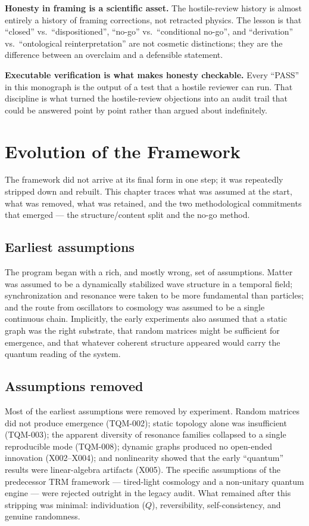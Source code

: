 \documentclass[10pt,twoside,openany]{book}
\begin{document}
\textbf{Honesty in framing is a scientific asset.} The hostile-review history is almost
entirely a history of framing corrections, not retracted physics. The lesson is that
``closed'' vs.\ ``dispositioned'', ``no-go'' vs.\ ``conditional no-go'', and ``derivation''
vs.\ ``ontological reinterpretation'' are not cosmetic distinctions; they are the
difference between an overclaim and a defensible statement.

\textbf{Executable verification is what makes honesty checkable.} Every ``PASS'' in this
monograph is the output of a test that a hostile reviewer can run. That discipline is what
turned the hostile-review objections into an audit trail that could be answered point by
point rather than argued about indefinitely.

\chapter{Evolution of the Framework}
\label{ch:evolution}

The framework did not arrive at its final form in one step; it was repeatedly stripped
down and rebuilt. This chapter traces what was assumed at the start, what was removed,
what was retained, and the two methodological commitments that emerged --- the
structure/content split and the no-go method.

\section{Earliest assumptions}

The program began with a rich, and mostly wrong, set of assumptions. Matter was assumed to
be a dynamically stabilized wave structure in a temporal field; synchronization and
resonance were taken to be more fundamental than particles; and the route from oscillators
to cosmology was assumed to be a single continuous chain. Implicitly, the early experiments
also assumed that a static graph was the right substrate, that random matrices might be
sufficient for emergence, and that whatever coherent structure appeared would carry the
quantum reading of the system.

\section{Assumptions removed}

Most of the earliest assumptions were removed by experiment. Random matrices did not
produce emergence (TQM-002); static topology alone was insufficient (TQM-003); the
apparent diversity of resonance families collapsed to a single reproducible mode (TQM-008);
dynamic graphs produced no open-ended innovation (X002--X004); and nonlinearity showed that
the early ``quantum'' results were linear-algebra artifacts (X005). The specific assumptions
of the predecessor TRM framework --- tired-light cosmology and a non-unitary quantum engine
--- were rejected outright in the legacy audit. What remained after this stripping was
minimal: individuation ($Q$), reversibility, self-consistency, and genuine randomness.
\end{document}
